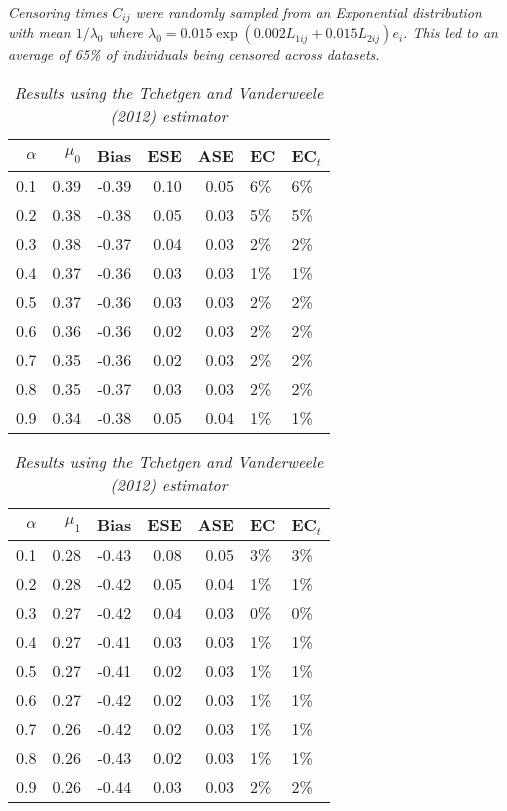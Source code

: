 \documentclass[12pt, letterpaper]{article}
\begin{document}
\begin{table}[ht!]
{		\textit{Censoring times $C_{ij}$ were randomly sampled from an Exponential distribution with mean $1/\lambda_0$ where $\lambda_0=0.015\exp(0.002L_{1ij}+0.015L_{2ij})e_i$. This led to an average of 65\% of individuals being censored across datasets.}	
	}
\end{table}
\begin{table}[ht!]
	\centering
	\bgroup
	\def\arraystretch{1.25}
	\setlength\tabcolsep{0.05in}
	\begin{tabular}{rrrrrll}
		\hline
		$\alpha$ & $\mu_0$ & Bias & ESE & ASE & EC & EC$_t$ \\ \hline
	0.1 & 0.39 & -0.39 & 0.10 & 0.05 & 6\% & 6\% \\ 
	0.2 & 0.38 & -0.38 & 0.05 & 0.03 & 5\% & 5\% \\ 
	0.3 & 0.38 & -0.37 & 0.04 & 0.03 & 2\% & 2\% \\ 
	0.4 & 0.37 & -0.36 & 0.03 & 0.03 & 1\% & 1\% \\ 
	0.5 & 0.37 & -0.36 & 0.03 & 0.03 & 2\% & 2\% \\ 
	0.6 & 0.36 & -0.36 & 0.02 & 0.03 & 2\% & 2\% \\ 
	0.7 & 0.35 & -0.36 & 0.02 & 0.03 & 2\% & 2\% \\ 
	0.8 & 0.35 & -0.37 & 0.03 & 0.03 & 2\% & 2\% \\ 
	0.9 & 0.34 & -0.38 & 0.05 & 0.04 & 1\% & 1\% \\ 
		\hline
	\end{tabular}
	\egroup
	\quad 
	\bgroup
	\setlength\tabcolsep{0.05in}
	\def\arraystretch{1.25}
	\begin{tabular}{rrrrrll}
		\hline
		$\alpha$ & $\mu_1$ & Bias & ESE & ASE & EC & EC$_t$ \\ \hline
0.1 & 0.28 & -0.43 & 0.08 & 0.05 & 3\% & 3\% \\ 
0.2 & 0.28 & -0.42 & 0.05 & 0.04 & 1\% & 1\% \\ 
0.3 & 0.27 & -0.42 & 0.04 & 0.03 & 0\% & 0\% \\ 
0.4 & 0.27 & -0.41 & 0.03 & 0.03 & 1\% & 1\% \\ 
0.5 & 0.27 & -0.41 & 0.02 & 0.03 & 1\% & 1\% \\ 
0.6 & 0.27 & -0.42 & 0.02 & 0.03 & 1\% & 1\% \\ 
0.7 & 0.26 & -0.42 & 0.02 & 0.03 & 1\% & 1\% \\ 
0.8 & 0.26 & -0.43 & 0.02 & 0.03 & 1\% & 1\% \\ 
0.9 & 0.26 & -0.44 & 0.03 & 0.03 & 2\% & 2\% \\ 
		\hline
	\end{tabular}
	\egroup
	\caption*{
		\textit{Results using the  Tchetgen and Vanderweele (2012) estimator}	
	}
\end{table}
\end{document}
